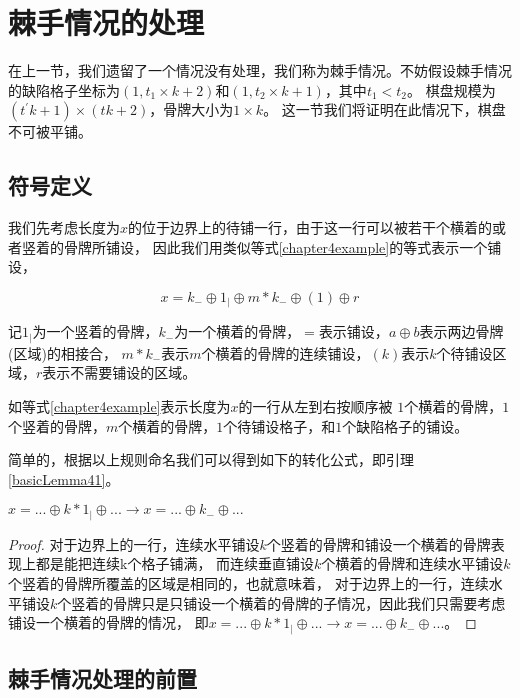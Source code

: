 \chapter{棘手情况的处理}

在上一节，我们遗留了一个情况没有处理，我们称为棘手情况。不妨假设棘手情况的缺陷格子坐标为$(1, t_1 \times k + 2)$和$(1, t_2 \times k + 1)$，其中$t_1 < t_2$。
棋盘规模为$(t^{'}k + 1) \times (tk + 2)$，骨牌大小为$1 \times k$。
这一节我们将证明在此情况下，棋盘不可被平铺。
\section{符号定义}
我们先考虑长度为$x$的位于边界上的待铺一行，由于这一行可以被若干个横着的或者竖着的骨牌所铺设，
因此我们用类似等式\ref{chapter4example}的等式表示一个铺设，

\begin{equation}
    x = k_{-} \oplus 1_{\vert} \oplus m * k_{-} \oplus (1) \oplus r
    \label{chapter4example}
\end{equation}

记$1_{\vert}$为一个竖着的骨牌，$k_{-}$为一个横着的骨牌，$=$表示铺设，$a \oplus b$表示两边骨牌(区域)的相接合，
$m * k_{-}$表示$m$个横着的骨牌的连续铺设，$(k)$表示$k$个待铺设区域，$r$表示不需要铺设的区域。

如等式\ref{chapter4example}表示长度为$x$的一行从左到右按顺序被
$1$个横着的骨牌，$1$个竖着的骨牌，$m$个横着的骨牌，$1$个待铺设格子，和$1$个缺陷格子的铺设。

简单的，根据以上规则命名我们可以得到如下的转化公式，即引理\ref{basicLemma41}。

\begin{lemma}
    $x =... \oplus k * 1_{\vert} \oplus ... \rightarrow x = ... \oplus k_{-} \oplus ...$
    \label{basicLemma41}
\end{lemma}
\begin{proof}
    对于边界上的一行，连续水平铺设$k$个竖着的骨牌和铺设一个横着的骨牌表现上都是能把连续k个格子铺满，
    而连续垂直铺设$k$个横着的骨牌和连续水平铺设$k$个竖着的骨牌所覆盖的区域是相同的，也就意味着，
    对于边界上的一行，连续水平铺设$k$个竖着的骨牌只是只铺设一个横着的骨牌的子情况，因此我们只需要考虑铺设一个横着的骨牌的情况，
    即$x =... \oplus k * 1_{\vert} \oplus ... \rightarrow x = ... \oplus k_{-} \oplus ...$。
\end{proof}

\section{棘手情况处理的前置}


